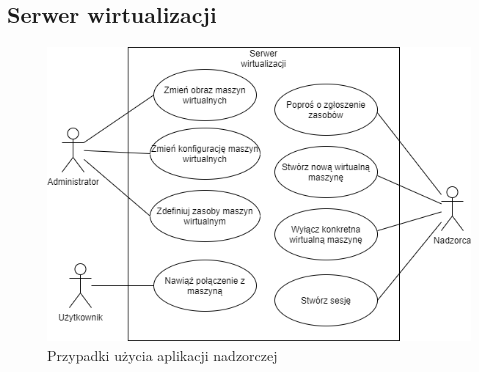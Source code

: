 \documentclass[../wstep.tex]{subfiles}
\begin{document}
\subsection{Serwer wirtualizacji}

\begin{figure}[H]
    \centering
    \includegraphics[width=\textwidth]{../diagrams/use_cases/virtualisation_server.png}
    \caption{Przypadki użycia aplikacji nadzorczej}
\end{figure}
\end{document}
